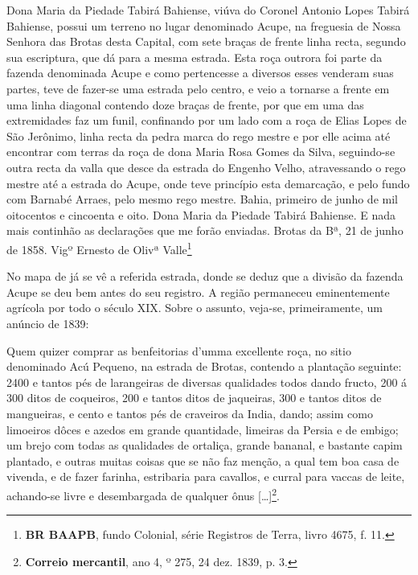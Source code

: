 \begin{citacao}
Dona Maria da Piedade Tabirá Bahiense, viúva do Coronel Antonio Lopes Tabirá Bahiense, possui um terreno no lugar denominado Acupe, na freguesia de Nossa Senhora das Brotas desta Capital, com sete braças de frente linha recta, segundo sua escriptura, que dá para a mesma estrada. Esta roça outrora foi parte da fazenda denominada Acupe e como pertencesse a diversos esses venderam suas partes, teve de fazer-se uma estrada pelo centro, e veio a tornarse a frente em uma linha diagonal contendo doze braças de frente, por que em uma das extremidades faz um funil, confinando por um lado com a roça de Elias Lopes de São Jerônimo, linha recta da pedra marca do rego mestre e por elle acima até encontrar com terras da roça de dona Maria Rosa Gomes da Silva, seguindo-se outra recta da valla que desce da estrada do Engenho Velho, atravessando o rego mestre até a estrada do Acupe, onde teve princípio esta demarcação, e pelo fundo com Barnabé Arraes, pelo mesmo rego mestre. Bahia, primeiro de junho de mil oitocentos e cincoenta e oito. Dona Maria da Piedade Tabirá Bahiense. E nada mais continhão as declarações que me forão enviadas. Brotas da Bª, 21 de junho de 1858. Vigº Ernesto de Olivª Valle\footnote{\textbf{BR BAAPB}, fundo Colonial, série Registros de Terra, livro 4675, f. 11.}
\end{citacao}

No mapa de  já se vê a referida estrada, donde se deduz que a divisão da fazenda Acupe se deu bem antes do seu registro. A região permaneceu eminentemente agrícola por todo o século XIX. Sobre o assunto, veja-se, primeiramente, um anúncio de 1839:

\begin{citacao}
Quem quizer comprar as benfeitorias d'umma excellente roça, no sitio denominado Acú Pequeno, na estrada de Brotas, contendo a plantação seguinte: 2400 e tantos pés de larangeiras de diversas qualidades todos dando fructo, 200 á 300 ditos de coqueiros, 200 e tantos ditos de jaqueiras, 300 e tantos ditos de mangueiras, e cento e tantos pés de craveiros da India, dando; assim como limoeiros dôces e azedos em grande quantidade, limeiras da Persia e de embigo; um brejo com todas as qualidades de ortaliça, grande bananal, e bastante capim plantado, e outras muitas coisas que se não faz menção, a qual tem boa casa de vivenda, e de fazer farinha, estribaria para cavallos, e curral para vaccas de leite, achando-se livre e desembargada de qualquer ônus [\dots]\footnote{\textbf{Correio mercantil}, ano 4, º 275, 24 dez. 1839, p. 3.}.
\end{citacao}

